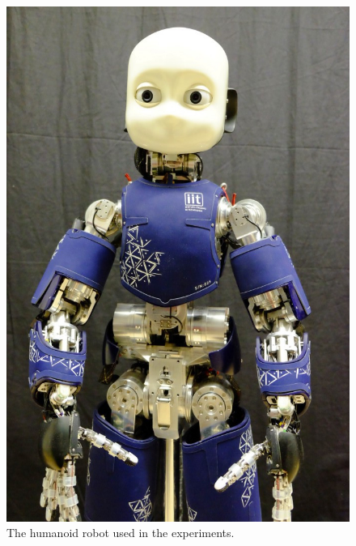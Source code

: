 \begin{figure}
	\centering
	\includegraphics[width=.99\linewidth]{robertoICRA/fig/iCubDarmstadt01}
	\caption{The humanoid robot \robot{} used in the experiments.}
	\label{fig:icub}
	\figspace
\end{figure}

